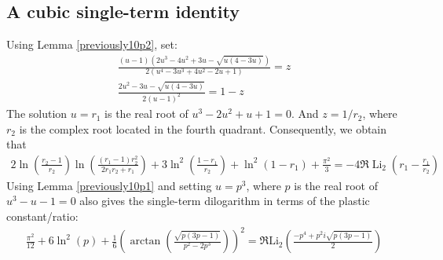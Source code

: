 \documentclass[12pt]{article}
\begin{document}
\subsection{A cubic single-term identity}
Using Lemma \ref{previously10p2}, set:
\begin{equation*}
\begin{aligned}
\frac{(u-1) \left(2 u^3 - 4 u^2 + 3 u - \sqrt{u(4 - 3 u)}\right)}{2 \left(u^4 - 3 u^3 + 4 u^2 - 2 u + 1\right)} = z
\\
\frac{2 u^2 - 3 u - \sqrt{u(4 - 3 u)}}{2 (u-1)^2} = 1 - z
\end{aligned}
\end{equation*}
 The solution $u=r_1$ is the real root of $u^3 - 2 u^2 + u + 1=0$. And $z=1/r_2$, where $r_2$ is the complex root located 
 in the fourth quadrant.
 Consequently, we obtain that 
\begin{equation*}
\begin{aligned}
2 \ln\left(\frac{r_2 - 1}{r_2}\right) \ln\left(\frac{(r_1 - 1) r_2^2}{2 r_1 r_2 + r_1}\right) 
+ 3 \ln^2\left(\frac{1 - r_1}{r_2}\right) 
+ \ln^2(1 - r_1) 
+ \frac{\pi^2}{3} 
= -4 \Re \operatorname{Li}_2\left(r_1 - \frac{r_1}{r_2}\right)
\end{aligned}
\end{equation*}
 Using Lemma \ref{previously10p1} and setting $u=p^3$, where $p$ is the 
 real root of $u^3-u-1=0$ also gives the single-term dilogarithm in terms of the plastic constant/ratio: 
\begin{equation*}
\begin{aligned}
\frac{\pi^2}{12} + 6 \ln^2(p) + \frac{1}{6} \left( \operatorname{arctan} \left( \frac{\sqrt{p (3 p - 1)}}{p^2 - 2 p^3} \right) \right)^2 
= \Re\mathrm{Li}_2\left( \frac{-p^4 + p^2 i \sqrt{p (3p - 1)}}{2} \right)
\end{aligned}
\end{equation*}
\end{document}
